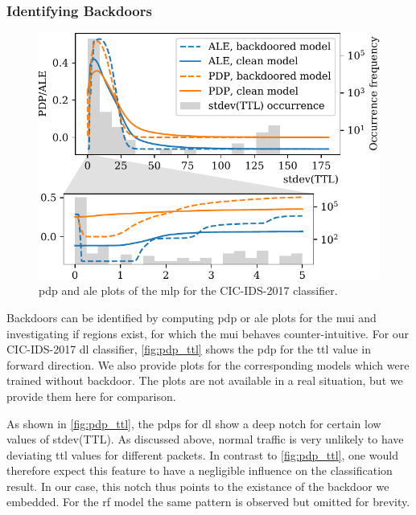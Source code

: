 \documentclass[10pt,sigconf,letterpaper,dvipsnames]{acmart}
\begin{document}
\subsubsection{Identifying Backdoors}
\begin{figure}[h]
\includegraphics[width=\columnwidth]{figures/pdpale2017nn_joint.pdf}

\caption{\gls{pdp} and \gls{ale} plots of the \gls{mlp} for the CIC-IDS-2017 classifier.} %
\label{fig:pdp_ttl}
\end{figure}
Backdoors can be identified by computing \gls{pdp} or \gls{ale} plots for the \gls{mui} and investigating if regions exist, for which the \gls{mui} behaves counter-intuitive. For our CIC-IDS-2017 \gls{dl} classifier, \autoref{fig:pdp_ttl} shows the \gls{pdp} for the \gls{ttl} value in forward direction. We also provide plots for the corresponding models which were trained without backdoor. The plots are not available in a real situation, but we provide them here for comparison.

As shown in \autoref{fig:pdp_ttl}, the \glspl{pdp} for \gls{dl} show a deep notch for certain low values of stdev(TTL). As discussed above, normal traffic is very unlikely to have deviating \gls{ttl} values for different packets. In contrast to \autoref{fig:pdp_ttl}, one would therefore expect this feature to have a negligible influence on the classification result. In our case, this notch thus points to the existance of the backdoor we embedded. For the \gls{rf} model the same pattern is observed but omitted for brevity.
\end{document}
